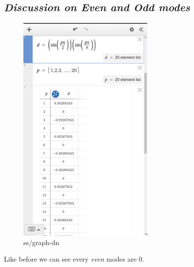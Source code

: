 \documentclass[letter, 10pts]{article}
\begin{document}
\subsection*{\emph{Discussion on Even and Odd modes}}
\begin{figure}[H]
	\centering
	\includegraphics[width=0.6\textwidth]{../phys311/ss/graph-dn}
	\caption{ss/graph-dn}
	\label{fig:ss-graph-dn}
\end{figure}
Like before we can see every  \emph{even} modes are 0. 
\end{document}
